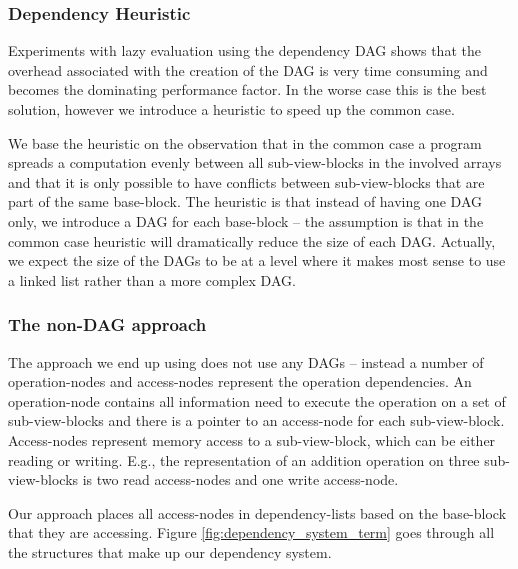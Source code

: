 \documentclass[preprint]{../PGAS10/sigplanconf}
\begin{document}
\subsubsection{Dependency Heuristic}
Experiments with lazy evaluation using the dependency DAG shows that the overhead associated with the creation of the DAG is very time consuming and becomes the dominating performance factor. In the worse case this is the best solution, however we introduce a heuristic to speed up the common case. 

We base the heuristic on the observation that in the common case a program spreads a computation evenly between all sub-view-blocks in the involved arrays and that it is only possible to have conflicts between sub-view-blocks that are part of the same base-block. The heuristic is that instead of having one DAG only, we introduce a DAG for each base-block -- the assumption is that in the common case heuristic will dramatically reduce the size of each DAG. Actually, we expect the size of the DAGs to be at a level where it makes most sense to use a linked list rather than a more complex DAG.


\subsubsection{The non-DAG approach}
The approach we end up using does not use any DAGs -- instead a number of operation-nodes and access-nodes represent the operation dependencies. An operation-node contains all information need to execute the operation on a set of sub-view-blocks and there is a pointer to an access-node for each sub-view-block. Access-nodes represent memory access to a sub-view-block, which can be either reading or writing. E.g., the representation of an addition operation on three sub-view-blocks is two read access-nodes and one write access-node. 

Our approach places all access-nodes in dependency-lists based on the base-block that they are accessing. Figure \ref{fig:dependency_system_term} goes through all the structures that make up our dependency system.

\end{document}
